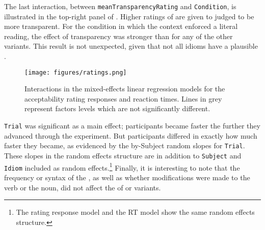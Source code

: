 \documentclass[output=paper
,modfonts
,nonflat]{langsci/langscibook}
\begin{document}


The last interaction, between \texttt{meanTransparencyRating} and \texttt{Condition}, is illustrated in the top-right panel of . Higher ratings of  are given to  judged to be more transparent.  For the condition in which the context enforced a literal  reading, the effect of transparency was stronger than for any of the other  variants.  This result is not unexpected, given that not all idioms have a plausible  \citep{TitoneConnine1994}. 


\begin{figure}
\centering
\texttt{[image: figures/ratings.png]}
\caption{Interactions in the mixed-effects linear regression models for the acceptability rating responses and reaction times. Lines in grey represent factors levels which are not significantly different.}
\label{plotRatings}
\end{figure}


\texttt{Trial} was significant as a main effect; participants became faster the further they advanced through the experiment. But participants differed in exactly how much faster they became, as evidenced by the by-Subject random slopes for \texttt{Trial}. These slopes in the random effects structure are in addition to \texttt{Subject} and \texttt{Idiom} included as random effects.\footnote{The rating response model and the RT model show the same random effects structure.} Finally, it is interesting to note that the frequency or syntax of the , as well as whether modifications were made to the verb or the noun, did not affect the  of  or variants. 
\end{document}
